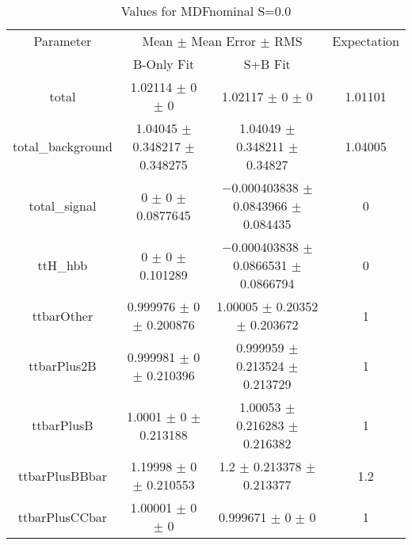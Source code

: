 \begin{table}
\centering
\caption{Values for MDFnominal S=0.0}
\begin{tabular}{cccc}
\toprule
Parameter & \multicolumn{2}{c}{Mean $\pm$ Mean Error $\pm$ RMS} & Expectation\\
 & B-Only Fit & S+B Fit & \\
\midrule
total & \num{1.02114} $\pm$ \num{0} $\pm$ \num{0} & \num{1.02117} $\pm$ \num{0} $\pm$ \num{0} & \num{1.01101}\\
total\_background & \num{1.04045} $\pm$ \num{0.348217} $\pm$ \num{0.348275} & \num{1.04049} $\pm$ \num{0.348211} $\pm$ \num{0.34827} & \num{1.04005}\\
total\_signal & \num{0} $\pm$ \num{0} $\pm$ \num{0.0877645} & \num{-0.000403838} $\pm$ \num{0.0843966} $\pm$ \num{0.084435} & \num{0}\\
ttH\_hbb & \num{0} $\pm$ \num{0} $\pm$ \num{0.101289} & \num{-0.000403838} $\pm$ \num{0.0866531} $\pm$ \num{0.0866794} & \num{0}\\
ttbarOther & \num{0.999976} $\pm$ \num{0} $\pm$ \num{0.200876} & \num{1.00005} $\pm$ \num{0.20352} $\pm$ \num{0.203672} & \num{1}\\
ttbarPlus2B & \num{0.999981} $\pm$ \num{0} $\pm$ \num{0.210396} & \num{0.999959} $\pm$ \num{0.213524} $\pm$ \num{0.213729} & \num{1}\\
ttbarPlusB & \num{1.0001} $\pm$ \num{0} $\pm$ \num{0.213188} & \num{1.00053} $\pm$ \num{0.216283} $\pm$ \num{0.216382} & \num{1}\\
ttbarPlusBBbar & \num{1.19998} $\pm$ \num{0} $\pm$ \num{0.210553} & \num{1.2} $\pm$ \num{0.213378} $\pm$ \num{0.213377} & \num{1.2}\\
ttbarPlusCCbar & \num{1.00001} $\pm$ \num{0} $\pm$ \num{0} & \num{0.999671} $\pm$ \num{0} $\pm$ \num{0} & \num{1}\\
\bottomrule
\end{tabular}
\end{table}